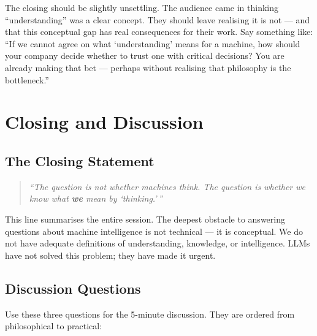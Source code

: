 \documentclass[11pt, a4paper]{article}
\begin{document}
\begin{speakingnote}
The closing should be slightly unsettling. The audience came in thinking
``understanding'' was a clear concept. They should leave realising it is
not --- and that this conceptual gap has real consequences for their work.
Say something like: ``If we cannot agree on what `understanding' means for
a machine, how should your company decide whether to trust one with
critical decisions? You are already making that bet --- perhaps without
realising that philosophy is the bottleneck.''
\end{speakingnote}


\section{Closing and Discussion}

\subsection{The Closing Statement}

\begin{quote}
\emph{``The question is not whether machines think. The question is
whether we know what \textbf{we} mean by `thinking.'\,''}
\end{quote}

This line summarises the entire session. The deepest obstacle to answering
questions about machine intelligence is not technical --- it is
conceptual. We do not have adequate definitions of understanding,
knowledge, or intelligence. LLMs have not solved this problem; they have
made it urgent.


\subsection{Discussion Questions}

Use these three questions for the 5-minute discussion. They are ordered
from philosophical to practical:
\end{document}
